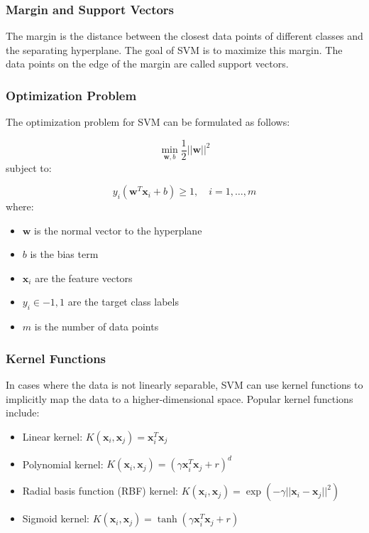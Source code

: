 \documentclass[12pt]{article}
\begin{document}
\subsubsection{Margin and Support Vectors}

The margin is the distance between the closest data points of different classes and the separating hyperplane. The goal of SVM is to maximize this margin. The data points on the edge of the margin are called support vectors.

\subsubsection{Optimization Problem}

The optimization problem for SVM can be formulated as follows:

$$\min_{\mathbf{w}, b} \frac{1}{2} ||\mathbf{w}||^2 $$
subject to:

$$ y_i (\mathbf{w}^T \mathbf{x}_i + b) \geq 1, \quad i = 1, \dots, m $$
where:
\begin{itemize}
\item $\mathbf{w}$ is the normal vector to the hyperplane
\item $b$ is the bias term
\item $\mathbf{x}_i$ are the feature vectors
\item $y_i \in {-1, 1}$ are the target class labels
\item $m$ is the number of data points
\end{itemize}

\subsubsection{Kernel Functions}

In cases where the data is not linearly separable, SVM can use kernel functions to implicitly map the data to a higher-dimensional space. Popular kernel functions include:

\begin{itemize}
\item Linear kernel: $K(\mathbf{x}_i, \mathbf{x}_j) = \mathbf{x}_i^T \mathbf{x}_j$
\item Polynomial kernel: $K(\mathbf{x}_i, \mathbf{x}_j) = (\gamma \mathbf{x}_i^T \mathbf{x}_j + r)^d$
\item Radial basis function (RBF) kernel: $K(\mathbf{x}_i, \mathbf{x}_j) = \exp(-\gamma ||\mathbf{x}_i - \mathbf{x}_j||^2)$
\item Sigmoid kernel: $K(\mathbf{x}_i, \mathbf{x}_j) = \tanh(\gamma \mathbf{x}_i^T \mathbf{x}_j + r)$
\end{itemize}
\end{document}
